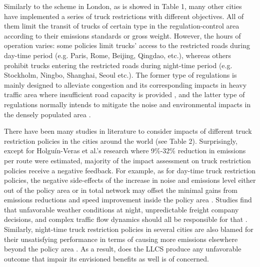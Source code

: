 \documentclass[preprint,12pt,3p]{elsarticle}
\begin{document}
Similarly to the scheme in London, as is showed in Table 1, many other cities have implemented a series of truck restrictions with different objectives. All of them limit the transit of trucks of certain type in the regulation-control area according to their emissions standards or gross weight. However, the hours of operation varies: some policies limit trucks’ access to the restricted roads during day-time period (e.g. Paris, Rome, Beijing, Qingdao, etc.), whereas others prohibit trucks entering the restricted roads during night-time period (e.g. Stockholm, Ningbo, Shanghai, Seoul etc.). The former type of regulations is mainly designed to alleviate congestion and its corresponding impacts in heavy traffic area where insufficient road capacity is provided \cite{RN61,RN86,RN141}, and the latter type of regulations normally intends to mitigate the noise and environmental impacts in the densely populated area \cite{RN69}.

There have been many studies in literature to consider impacts of different truck restriction policies in the cities around the world (see Table 2). Surprisingly, except for Holguín-Veras et al.'s research \cite{RN53} where 9$\%$-32$\%$ reduction in emissions per route were estimated, majority of the impact assessment on truck restriction policies receive a negative feedback. For example, as for day-time truck restriction policies, the negative side-effects of the increase in noise and emissions level either out of the policy area or in total network may offset the minimal gains from emissions reductions and speed improvement inside the policy area \cite{RN61,RN139}. Studies find that unfavorable weather conditions at night, unpredictable freight company decisions, and complex traffic flow dynamics should all be responsible for that \cite{RN143,RN142}. Similarly, night-time truck restriction policies in several cities are also blamed for their unsatisfying performance in terms of causing more emissions elsewhere beyond the policy area \cite{RN69}. As a result, does the LLCS produce any unfavorable outcome that impair its envisioned benefits as well is of concerned.
\end{document}
